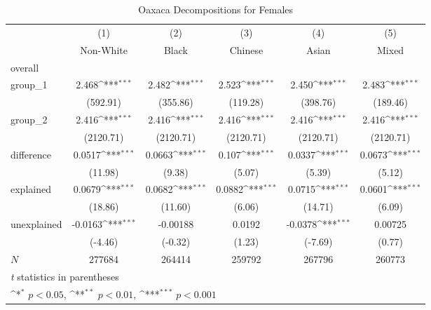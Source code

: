\begin{table}[htbp]\centering
\def\sym#1{\ifmmode^{#1}\else\(^{#1}\)\fi}
\caption{Oaxaca Decompositions for Females\label{tab1}}
\begin{tabular}{l*{5}{c}}
\hline\hline
            &\multicolumn{1}{c}{(1)}&\multicolumn{1}{c}{(2)}&\multicolumn{1}{c}{(3)}&\multicolumn{1}{c}{(4)}&\multicolumn{1}{c}{(5)}\\
            &\multicolumn{1}{c}{Non-White}&\multicolumn{1}{c}{Black}&\multicolumn{1}{c}{Chinese}&\multicolumn{1}{c}{Asian}&\multicolumn{1}{c}{Mixed}\\
\hline
overall     &                     &                     &                     &                     &                     \\
group\_1     &       2.468\sym{***}&       2.482\sym{***}&       2.523\sym{***}&       2.450\sym{***}&       2.483\sym{***}\\
            &    (592.91)         &    (355.86)         &    (119.28)         &    (398.76)         &    (189.46)         \\
group\_2     &       2.416\sym{***}&       2.416\sym{***}&       2.416\sym{***}&       2.416\sym{***}&       2.416\sym{***}\\
            &   (2120.71)         &   (2120.71)         &   (2120.71)         &   (2120.71)         &   (2120.71)         \\
difference  &      0.0517\sym{***}&      0.0663\sym{***}&       0.107\sym{***}&      0.0337\sym{***}&      0.0673\sym{***}\\
            &     (11.98)         &      (9.38)         &      (5.07)         &      (5.39)         &      (5.12)         \\
explained   &      0.0679\sym{***}&      0.0682\sym{***}&      0.0882\sym{***}&      0.0715\sym{***}&      0.0601\sym{***}\\
            &     (18.86)         &     (11.60)         &      (6.06)         &     (14.71)         &      (6.09)         \\
unexplained &     -0.0163\sym{***}&    -0.00188         &      0.0192         &     -0.0378\sym{***}&     0.00725         \\
            &     (-4.46)         &     (-0.32)         &      (1.23)         &     (-7.69)         &      (0.77)         \\
\hline
\(N\)       &      277684         &      264414         &      259792         &      267796         &      260773         \\
\hline\hline
\multicolumn{6}{l}{\footnotesize \textit{t} statistics in parentheses}\\
\multicolumn{6}{l}{\footnotesize \sym{*} \(p<0.05\), \sym{**} \(p<0.01\), \sym{***} \(p<0.001\)}\\
\end{tabular}
\label{tab:oaxaca_female_summary}
\end{table}
